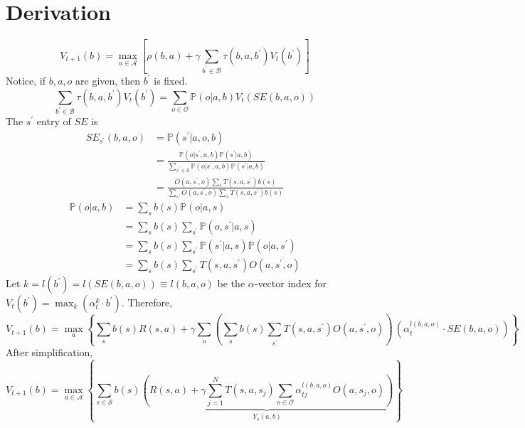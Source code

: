 \documentclass[a4paper,onecolumn]{article}
\begin{document}
\section{Derivation}
\begin{equation}
    V_{t+1}(b) = \max_{a\in\mathcal{A}}\left[\rho(b, a)+ \gamma
	\sum_{b^\prime\in \mathcal{B}}\tau(b, a, b^\prime) V_t(b^\prime)\right]
\end{equation}
Notice, if $b, a, o$ are given, then $b^\prime$ is fixed.
\begin{equation}
    \sum_{b^\prime\in\mathcal{B}} \tau(b, a, b^\prime)V_t(b^\prime) =
	\sum_{o\in\mathcal{O}}
	\mathbb{P}(o|a, b) V_t(SE(b,a,o))
\end{equation}
The $s^\prime$ entry of $SE$ is
\begin{equation}\begin{split}
    SE_{s^\prime}(b,a,o) &= \mathbb{P}(s^\prime|a, o, b)\\
	&=\frac{\mathbb{P}(o|s^\prime, a,
	b)\mathbb{P}(s^\prime|a,b)}{\sum_{s^\prime\in
	\mathcal{S}} \mathbb{P}(o|s^\prime, a,
	    b)\mathbb{P}(s^\prime|a,b)}\\
	&= \frac{
	  O(a,s^\prime, o) \sum_s T(s,a,s^\prime)b(s)
	}{
	  \sum_{s^\prime}O(a,s^\prime, o) \sum_s T(s,a,s^\prime)b(s)
	}
\end{split}\end{equation}
\begin{equation}\begin{split}
    \mathbb{P}(o|a,b) &= \sum_s b(s) \mathbb{P}(o|a,s)\\
	&= \sum_s b(s) \sum_{s^\prime} \mathbb{P}(o,s^\prime|a,s)\\
    &= \sum_s b(s) \sum_{s^\prime}
	\mathbb{P}(s^\prime|a,s)\mathbb{P}(o|a,s^\prime)\\
	&= \sum_s b(s) \sum_{s^\prime} T(s,a,s^\prime)O(a,s^\prime, o)
\end{split}\end{equation}
Let $k = l(b^\prime) = l\left(SE(b,a,o)\right) \equiv l(b,a,o)$ be the $\alpha$-vector
index for $V_t(b^\prime) =
\max_k(\alpha^k_t\cdot b^\prime)$.
Therefore,
\begin{equation}
    V_{t+1}(b) = \max_a\left\{
	  \sum_s b(s)R(s,a) + \gamma \sum_o\left(
	    \sum_s b(s)\sum_{s^\prime} T(s,a,s^\prime) O(a,s^\prime,o)
	  \right)\,
	  \left(\alpha^{l(b,a,o)}_t \cdot SE(b,a,o)\right)
	\right\}
\end{equation}
After simplification,
\begin{equation}
    V_{t+1}(b) = \max_{a\in\mathcal{A}}\left\{
	    \sum_{s\in\mathcal{S}} b(s)
		\underbrace{
		\left(
		  R(s,a) + \gamma \sum_{j=1}^N
		  T(s,a,s_j)
		  \sum_{o\in\mathcal{O}}
		  \alpha_{tj}^{l(b,a,o)}O(a,s_j,o)
		\right)
		}_{Y_s(a,b)}
	\right\}
	\label{Bellman}
\end{equation}
\end{document}

